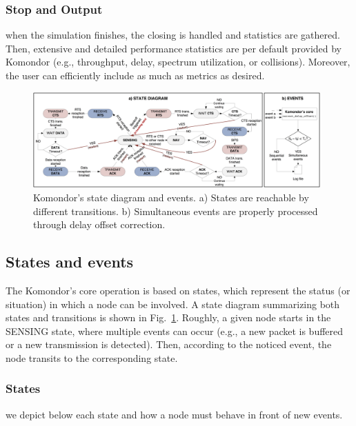 \documentclass[conference]{IEEEtran}
\begin{document}
	\subsubsection{Stop and Output}
	when the simulation finishes, the closing is handled and statistics are gathered. Then, extensive and detailed performance statistics are per default provided by Komondor (e.g., throughput, delay, spectrum utilization, or collisions). Moreover, the user can efficiently include as much as metrics as desired.
	
	\begin{figure}[t]
		\centering
		\includegraphics[width=0.98\textwidth]{state_diagram.png}
		\caption{Komondor's state diagram and events. a) States are reachable by different transitions. b) Simultaneous events are properly processed through delay offset correction.}
		\label{fig:state_diagram}
	\end{figure}
	
	\subsection{States and events}
	\label{subsection:state_diagram}
	The Komondor's core operation is based on states, which represent the status (or situation) in which a node can be involved. A state diagram summarizing both states and transitions is shown in Fig.~\ref{fig:state_diagram}. Roughly, a given node starts in the SENSING state, where multiple events can occur (e.g., a new packet is buffered or a new transmission is detected). Then, according to the noticed event, the node transits to the corresponding state. 
	
	\subsubsection{States}
	we depict below each state and how a node must behave in front of new events.
	
\end{document}
